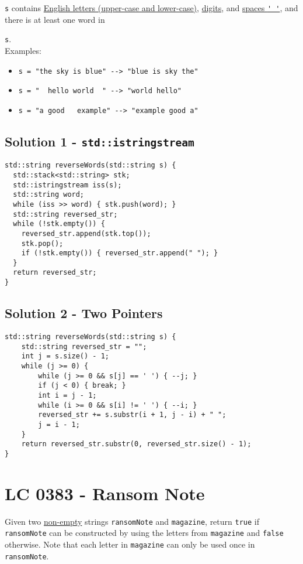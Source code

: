 {\colorbox{CodeBackground}{\lstinline|s|}} contains \ul{English letters (upper-case and lower-case)}, \ul{digits}, and \ul{spaces {\colorbox{CodeBackground}{\lstinline|' '|}}}, and there is at least one word in {\colorbox{CodeBackground}{\lstinline|s|}.\\

Examples:
\begin{itemize}
	\item {\colorbox{CodeBackground}{\lstinline|s = "the sky is blue" --> "blue is sky the"|}}
	\item {\colorbox{CodeBackground}{\lstinline|s = "  hello world  " --> "world hello"|}}
	\item {\colorbox{CodeBackground}{\lstinline|s = "a good   example" --> "example good a"|}}
\end{itemize}

\subsection*{Solution 1 - {\colorbox{CodeBackground}{\lstinline|std::istringstream|}}}
\begin{lstlisting}
std::string reverseWords(std::string s) {
  std::stack<std::string> stk;
  std::istringstream iss(s);
  std::string word;
  while (iss >> word) { stk.push(word); }
  std::string reversed_str;
  while (!stk.empty()) {
    reversed_str.append(stk.top());
    stk.pop();
    if (!stk.empty()) { reversed_str.append(" "); }
  }
  return reversed_str;
}
\end{lstlisting}

\subsection*{Solution 2 - Two Pointers}
\begin{lstlisting}
std::string reverseWords(std::string s) {
	std::string reversed_str = "";
	int j = s.size() - 1;
	while (j >= 0) {
		while (j >= 0 && s[j] == ' ') { --j; }
		if (j < 0) { break; }
		int i = j - 1;
		while (i >= 0 && s[i] != ' ') { --i; }
		reversed_str += s.substr(i + 1, j - i) + " ";
		j = i - 1;
	}
	return reversed_str.substr(0, reversed_str.size() - 1);
}
\end{lstlisting}

\section{LC 0383 - Ransom Note}\label{lc0383}
Given two \ul{non-empty} strings {\colorbox{CodeBackground}{\lstinline|ransomNote|}} and {\colorbox{CodeBackground}{\lstinline|magazine|}}, return {\colorbox{CodeBackground}{\lstinline|true|}} if {\colorbox{CodeBackground}{\lstinline|ransomNote|}} can be constructed by using the letters from {\colorbox{CodeBackground}{\lstinline|magazine|}} and {\colorbox{CodeBackground}{\lstinline|false|}} otherwise. Note that each letter in {\colorbox{CodeBackground}{\lstinline|magazine|}} can only be used once in {\colorbox{CodeBackground}{\lstinline|ransomNote|}}.\\

}
